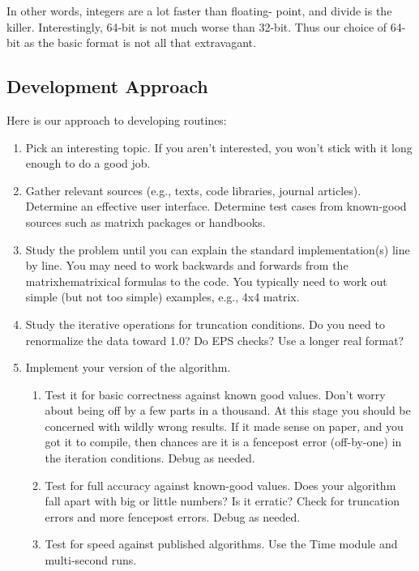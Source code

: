 In other words, integers are a lot faster than floating-
point, and divide is the killer.  Interestingly, 64-bit is
not much worse than 32-bit.  Thus our choice of 64-bit as
the basic format is not all that extravagant.


\subsection{Development Approach}
Here is our approach to developing routines:
\begin{enumerate}
     \item Pick an interesting topic.  If you aren't
     interested, you won't stick with it long enough to do a
     good job.
     
     \item Gather relevant sources (e.g., texts, code
     libraries, journal articles).  Determine an effective
     user interface.  Determine test cases from known-good
     sources such as matrixh packages or handbooks.
     
     \item Study the problem until you can explain the standard
     implementation(s) line by line.  You may need to work
     backwards and forwards from the matrixhematrixical formulas
     to the code.  You typically need to work out simple
     (but not too simple) examples, e.g., 4x4 matrix.
     
     \item Study the iterative operations for truncation
     conditions.  Do you need to renormalize the data toward
     1.0?  Do EPS checks?  Use a longer real format?
     
     \item Implement your version of the algorithm.
     \begin{enumerate}
          \item Test it for basic correctness against known
          good values.  Don't worry about being off by a few
          parts in a thousand.  At this stage you should be
          concerned with wildly wrong results.  If it made
          sense on paper, and you got it to compile, then
          chances are it is a fencepost error (off-by-one)
          in the iteration conditions.  Debug as needed.
          
          \item Test for full accuracy against known-good
          values.  Does your algorithm fall apart with big
          or little numbers?  Is it erratic?  Check for
          truncation errors and more fencepost errors.
          Debug as needed.
          
          \item Test for speed against published algorithms.
          Use the Time module and multi-second runs.
       \end{enumerate}
\end{enumerate}

